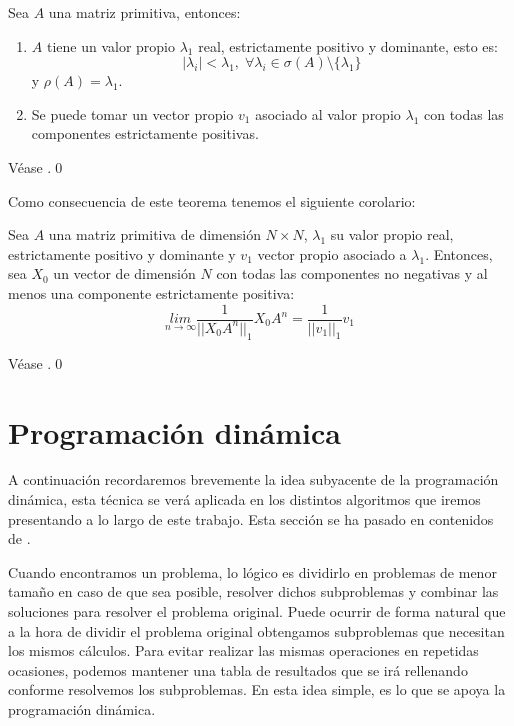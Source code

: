 \begin{theorem} \label{Perron-Frobenius}
    Sea $A$ una matriz primitiva, entonces:
    \begin{enumerate}
        \item $A$ tiene un valor propio $\lambda_1$ real, estrictamente positivo y dominante, esto es:
        \[|\lambda_i|<\lambda_1,\; \forall\lambda_i\in\sigma(A)\setminus \{\lambda_1\}\]
        y $\rho(A)=\lambda_1$.
        \item Se puede tomar un vector propio $v_1$ asociado al valor propio $\lambda_1$ con todas las componentes estrictamente positivas.
    \end{enumerate}
\end{theorem}
\begin{proofs*}
    Véase \cite[Página 202]{Salinelli}.\qed
\end{proofs*}
Como consecuencia de este teorema tenemos el siguiente corolario:
\begin{corollary} \label{colorarioPerron}
    Sea $A$ una matriz primitiva de dimensión $N\times N$, $\lambda_1$ su valor propio real, estrictamente positivo y dominante y $v_1$ vector propio asociado a $\lambda_1$. Entonces, sea $X_0$ un vector de dimensión $N$ con todas las componentes no negativas y al menos una componente estrictamente positiva:
    \[\underset{n\rightarrow\infty}{lim}\frac{1}{||X_0A^n||_1}X_0A^n=\frac{1}{||v_1||_1}v_1\]
\end{corollary}
\begin{proofs*}
    Véase \cite[Página 201, Teorema 5.19]{Salinelli}.\qed
\end{proofs*}

\section{Programación dinámica}
A continuación recordaremos brevemente la idea subyacente de la programación dinámica, esta técnica se verá aplicada en los distintos algoritmos que iremos presentando a lo largo de este trabajo. Esta sección se ha pasado en contenidos de \cite{algoritmia}.

Cuando encontramos un problema, lo lógico es dividirlo en problemas de menor tamaño en caso de que sea posible, resolver dichos subproblemas y combinar las soluciones para resolver el problema original. Puede ocurrir de forma natural que a la hora de dividir el problema original obtengamos subproblemas que necesitan los mismos cálculos. Para evitar realizar las mismas operaciones en repetidas ocasiones, podemos mantener una tabla de resultados que se irá rellenando conforme resolvemos los subproblemas. En esta idea simple, es lo que se apoya la programación dinámica.

